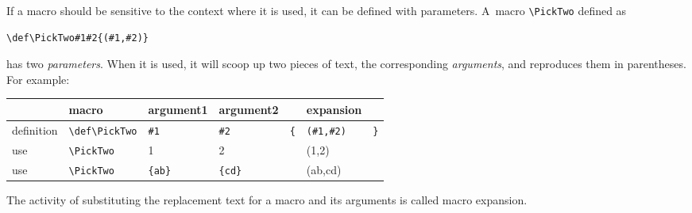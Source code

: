 If a macro should be sensitive to the context
where it is used, it can be defined with parameters.
A~macro \verb+\PickTwo+ defined as
\begin{verbatim}
\def\PickTwo#1#2{(#1,#2)}
\end{verbatim}
has two \emph{parameters}. When it is used, it will scoop up two pieces of
text, the corresponding \emph{arguments},
and reproduces them in parentheses.
For example:

\begin{tabular}{|l|llllll|}
\hline
          &macro              &argument1& argument2& 
    &expansion&\\ \hline
definition&\verb+\def\PickTwo+&\verb+#1+& \verb+#2+& \verb+{+& 
    \verb+(#1,#2)+& \verb+}+\\
use&       \verb+\PickTwo+&1&2&&(1,2)&\\
use&       \verb+\PickTwo+&\verb+{ab}+&\verb+{cd}+&&(ab,cd)&\\
\hline
\end{tabular}

The activity of substituting the replacement text
for a macro and its arguments is called {\italic macro expansion}.


